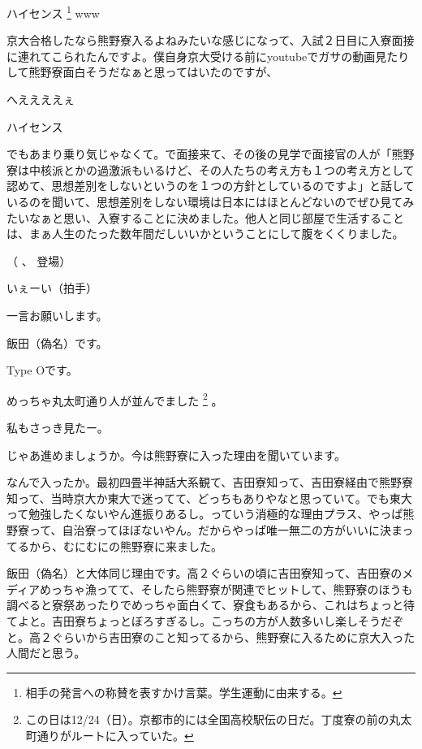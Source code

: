 \begin{multicols}{2}
  
ハイセンス \footnote{相手の発言への称賛を表すかけ言葉。学生運動に由来する。} www

  
京大合格したなら熊野寮入るよねみたいな感じになって、入試２日目に入寮面接に連れてこられたんですよ。僕自身京大受ける前にyoutubeでガサの動画見たりして熊野寮面白そうだなぁと思ってはいたのですが、

  
へええええぇ

  
ハイセンス

  
でもあまり乗り気じゃなくて。で面接来て、その後の見学で面接官の人が「熊野寮は中核派とかの過激派もいるけど、その人たちの考え方も１つの考え方として認めて、思想差別をしないというのを１つの方針としているのですよ」と話しているのを聞いて、思想差別をしない環境は日本にはほとんどないのでぜひ見てみたいなぁと思い、入寮することに決めました。他人と同じ部屋で生活することは、まぁ人生のたった数年間だしいいかということにして腹をくくりました。


\centerline{（\hspace{4pt} 、 登場\hspace{4pt}）}

  
いぇーい（拍手）

  
一言お願いします。

  
飯田（偽名）です。

  
Type Oです。

  
めっちゃ丸太町通り人が並んでました \footnote{この日は12/24（日）。京都市的には全国高校駅伝の日だ。丁度寮の前の丸太町通りがルートに入っていた。} 。

  
私もさっき見たー。

  
じゃあ進めましょうか。今は熊野寮に入った理由を聞いています。

  
なんで入ったか。最初四畳半神話大系観て、吉田寮知って、吉田寮経由で熊野寮知って、当時京大か東大で迷ってて、どっちもありやなと思っていて。でも東大って勉強したくないやん進振りあるし。っていう消極的な理由プラス、やっぱ熊野寮って、自治寮ってほぼないやん。だからやっぱ唯一無二の方がいいに決まってるから、むにむにの熊野寮に来ました。

  
飯田（偽名）と大体同じ理由です。高２ぐらいの頃に吉田寮知って、吉田寮のメディアめっちゃ漁ってて、そしたら熊野寮が関連でヒットして、熊野寮のほうも調べると寮祭あったりでめっちゃ面白くて、寮食もあるから、これはちょっと待てよと。吉田寮ちょっとぼろすぎるし。こっちの方が人数多いし楽しそうだぞと。高２ぐらいから吉田寮のこと知ってるから、熊野寮に入るために京大入った人間だと思う。


\end{multicols}
